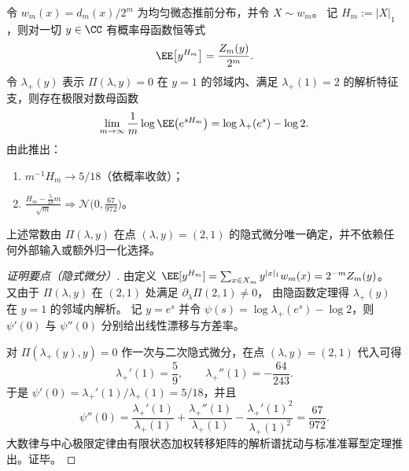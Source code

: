 \begin{conclusion}\label{con:xi-terminal-zm-lln-clt}
令 \(w_m(x)=d_m(x)/2^m\) 为均匀微态推前分布，并令 \(X\sim w_m\)。
记 \(H_m:=|X|_1\)，则对一切 \(y\in\CC\) 有概率母函数恒等式
\[
\EE\!\left[y^{H_m}\right]=\frac{Z_m(y)}{2^m}.
\]
令 \(\lambda_+(y)\) 表示 \(\Pi(\lambda,y)=0\) 在 \(y=1\) 的邻域内、满足 \(\lambda_+(1)=2\) 的解析特征支，则存在极限对数母函数
\[
\lim_{m\to\infty}\frac{1}{m}\log \EE\!\left(e^{sH_m}\right)
=\log\lambda_+(e^s)-\log 2.
\]
由此推出：
\begin{enumerate}
  \item \(m^{-1}H_m\to 5/18\)（依概率收敛）；
  \item \(\frac{H_m-\frac{5}{18}m}{\sqrt{m}}\Rightarrow \mathcal N\!\bigl(0,\frac{67}{972}\bigr)\)。
\end{enumerate}
上述常数由 \(\Pi(\lambda,y)\) 在点 \((\lambda,y)=(2,1)\) 的隐式微分唯一确定，并不依赖任何外部输入或额外归一化选择。
\end{conclusion}
\begin{proof}[证明要点（隐式微分）]
由定义
\(
\EE[y^{H_m}]
=\sum_{x\in X_m}y^{|x|_1}w_m(x)
=2^{-m}Z_m(y)
\)。
又由于 \(\Pi(\lambda,y)\) 在 \((2,1)\) 处满足 \(\partial_\lambda\Pi(2,1)\neq 0\)，
由隐函数定理得 \(\lambda_+(y)\) 在 \(y=1\) 的邻域内解析。
记 \(y=e^s\) 并令 \(\psi(s)=\log\lambda_+(e^s)-\log 2\)，则 \(\psi'(0)\) 与 \(\psi''(0)\) 分别给出线性漂移与方差率。
\par
对 \(\Pi(\lambda_+(y),y)=0\) 作一次与二次隐式微分，在点 \((\lambda,y)=(2,1)\) 代入可得
\[
\lambda_+'(1)=\frac{5}{9},
\qquad
\lambda_+''(1)=-\frac{64}{243}.
\]
于是
\(
\psi'(0)=\lambda_+'(1)/\lambda_+(1)=5/18
\)，并且
\[
\psi''(0)=\frac{\lambda_+'(1)}{\lambda_+(1)}+\frac{\lambda_+''(1)}{\lambda_+(1)}-\frac{\lambda_+'(1)^2}{\lambda_+(1)^2}
=\frac{67}{972}.
\]
大数律与中心极限定律由有限状态加权转移矩阵的解析谱扰动与标准准幂型定理推出。证毕。
\end{proof}

